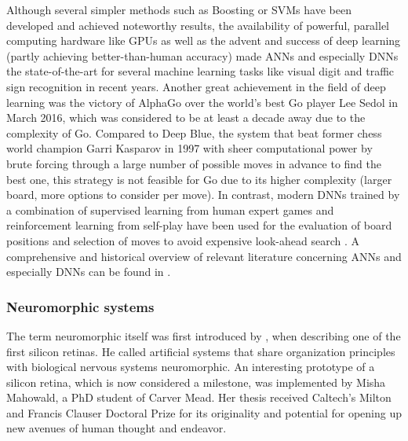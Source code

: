 Although several simpler methods such as Boosting \parencite{Freund1997} or \acp{SVM} \parencite{Vapnik1995} have been developed and achieved noteworthy results, the availability of powerful, parallel computing hardware like \acp{GPU} as well as the advent and success  of deep learning (partly achieving better-than-human accuracy) made \acp{ANN} \parencite{Rojas1996} and especially \acp{DNN} \parencite{LeCun2015} the state-of-the-art for several machine learning tasks like visual digit \parencite{Ciresan2012a} and traffic sign \parencite{Ciresan2012} recognition in recent years.
Another great achievement in the field of deep learning was the victory of AlphaGo \parencite{Silver2016} over the world's best Go player Lee Sedol in March 2016, which was considered to be at least a decade away due to the complexity of Go.
Compared to Deep Blue, the system that beat former chess world champion Garri Kasparov in 1997 \parencite{Hsu2002} with sheer computational power by brute forcing through a large number of possible moves in advance to find the best one, this strategy is not feasible for Go due to its higher complexity (larger board, more options to consider per move).
In contrast, modern \acp{DNN} trained by a combination of supervised learning from human expert games and reinforcement learning from self-play have been used for the evaluation of board positions and selection of moves to avoid expensive look-ahead search \parencite{Silver2016}.
A comprehensive and historical overview of relevant literature concerning \acp{ANN} and especially \acp{DNN} can be found in \textcite{Schmidhuber2015, LeCun2015}.

\subsubsection{Neuromorphic systems}

The term neuromorphic itself was first introduced by \textcite{Mead90}, when describing one of the first silicon retinas.
He called artificial systems that share organization principles with biological nervous systems neuromorphic.
An interesting prototype of a silicon retina, which is now considered a milestone, was implemented by Misha Mahowald, a PhD student of Carver Mead.
Her thesis received Caltech's Milton and Francis Clauser Doctoral Prize for its originality and potential for opening up new avenues of human thought and endeavor.

